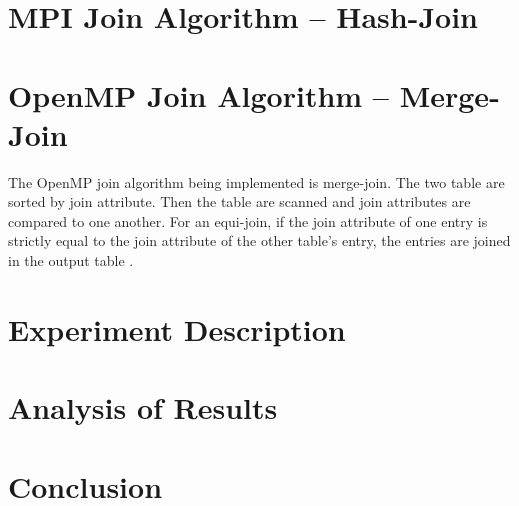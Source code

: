 \documentclass[journal,draftclsnofoot]{IEEEtran}
\begin{document}
\section{MPI Join Algorithm -- Hash-Join}\label{mpi}
\section{OpenMP Join Algorithm -- Merge-Join}\label{omp}
The OpenMP join algorithm being implemented is merge-join. The two table are sorted by join attribute. Then the table are scanned and join attributes are compared to one another. For an equi-join, if the join attribute of one entry is strictly equal to the join attribute of the other table's entry, the entries are joined in the output table \cite{Pavlo2017}. 
\section{Experiment Description}\label{desc}
\section{Analysis of Results}\label{ana}
\section{Conclusion}\label{conc}


\cleardoublepage
\onecolumn
\end{document}
